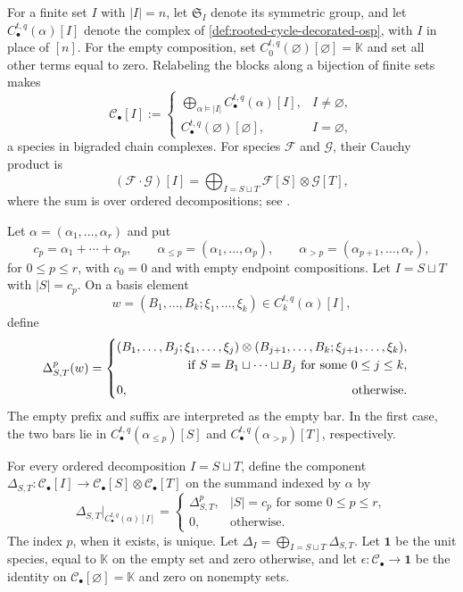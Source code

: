 \documentclass{amsart}
\theoremstyle{definition}
\theoremstyle{remark}
\newcommand{\kk}{\mathbb{K}}
\begin{document}
For a finite set $I$ with $|I|=n$, let $\mathfrak S_I$ denote its symmetric
group, and let $C_\bullet^{t,q}(\alpha)[I]$ denote the complex of
\cref{def:rooted-cycle-decorated-osp}, with $I$ in place of $[n]$.
For the empty composition, set
$C_0^{t,q}(\varnothing)[\varnothing]=\kk$ and set all other terms equal to
zero.  Relabeling the blocks along a bijection of finite sets makes
\begin{equation*}
 \mathcal C_\bullet[I]
 :=\begin{cases}
   \displaystyle\bigoplus_{\alpha\models |I|}
       C_\bullet^{t,q}(\alpha)[I],&I\neq\varnothing,\\[2mm]
   C_\bullet^{t,q}(\varnothing)[\varnothing],&I=\varnothing,
  \end{cases}
\end{equation*}
a species in bigraded chain complexes.  For species $\mathcal F$ and
$\mathcal G$, their Cauchy product is
\[
 (\mathcal F\mathbin{\cdot}\mathcal G)[I]
 =\bigoplus_{I=S\sqcup T}\mathcal F[S]\otimes\mathcal G[T],
\]
where the sum is over ordered decompositions; see
\cite{AguiarMahajan2010}.

Let $\alpha=(\alpha_1,\ldots,\alpha_r)$ and put
\[
 c_p=\alpha_1+\cdots+\alpha_p,\qquad
 \alpha_{\leq p}=(\alpha_1,\ldots,\alpha_p),\qquad
 \alpha_{>p}=(\alpha_{p+1},\ldots,\alpha_r),
\]
for $0\leq p\leq r$, with $c_0=0$ and with empty endpoint compositions.  Let
$I=S\sqcup T$ with $|S|=c_p$.  On a basis element
\[
 w=(B_1,\ldots,B_k;\xi_1,\ldots,\xi_k)
 \in C_k^{t,q}(\alpha)[I],
\]
define
\begin{equation}
 \Delta^p_{S,T}(w)=
 \begin{cases}
 (B_1,\ldots,B_j;\xi_1,\ldots,\xi_j)
 \otimes
 (B_{j+1},\ldots,B_k;\xi_{j+1},\ldots,\xi_k),
 \\
 \hfill\text{if }S=B_1\sqcup\cdots\sqcup B_j
       \text{ for some }0\leq j\leq k,\\[2mm]
 0,\hfill\text{otherwise}.
 \end{cases}
 \label{eq:cut-coproduct}
\end{equation}
The empty prefix and suffix are interpreted as the empty bar.  In the first
case, the two bars lie in
$C_\bullet^{t,q}(\alpha_{\leq p})[S]$ and
$C_\bullet^{t,q}(\alpha_{>p})[T]$, respectively.

For every ordered decomposition $I=S\sqcup T$, define the component
$\Delta_{S,T}:\mathcal C_\bullet[I]\to
\mathcal C_\bullet[S]\otimes\mathcal C_\bullet[T]$ on the summand indexed by
$\alpha$ by
\begin{equation*}
 \Delta_{S,T}\big|_{C_\bullet^{t,q}(\alpha)[I]}
 =\begin{cases}
   \Delta^p_{S,T},&|S|=c_p\text{ for some }0\leq p\leq r,\\
   0,&\text{otherwise}.
  \end{cases}
\end{equation*}
The index $p$, when it exists, is unique.  Let
$\Delta_I=\bigoplus_{I=S\sqcup T}\Delta_{S,T}$.  Let $\mathbf 1$
be the unit species, equal to $\kk$ on the empty set and zero otherwise, and
let $\epsilon:\mathcal C_\bullet\to\mathbf 1$ be the identity on
$\mathcal C_\bullet[\varnothing]=\kk$ and zero on nonempty sets.
\end{document}
